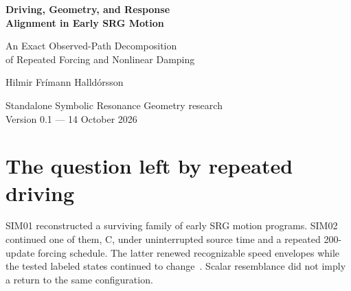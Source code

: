 \documentclass[11pt,a4paper]{article}
\begin{document}
\begin{center}
{\LARGE\bfseries Driving, Geometry, and Response\\[3pt] Alignment in Early SRG Motion\par}
\vspace{6pt}
{\large An Exact Observed-Path Decomposition\\of Repeated Forcing and Nonlinear Damping\par}
\vspace{12pt}
{\large Hilmir Frímann Halldórsson\par}
\vspace{5pt}
{Standalone Symbolic Resonance Geometry research\\Version 0.1 --- 14 October 2026}
\end{center}
\begin{abstract}
Repeated forcing can produce similar collective-speed envelopes without restoring the configurations through which the motion passes. We explain this coexistence in the accepted SIM02 records of historical SRG engine C, using the subsequent SIM03 passive decomposition. The analysis reconstructs the true sequential geometry from saved predecessor and successor positions, without evolving a trajectory. Its population is 1,800 distinct updates: one inherited 200-update prefix and two 800-update continuations. We separate squared impulse, signed velocity--impulse alignment and nonlinear damping in both a squared-speed balance and an exact balance for the actual mean speed. Geometric normalization is usually close to one but has localized exceptions. Alignment remains substantial and can oppose the incoming velocity. Damping is nonexpansive on fixed pre-damping velocity vectors, and the saved records separately show reduced scalar-speed population variance at every driving phase. Neither fact proves contraction of the complete state update. Two reviewer deductions sharpen the interpretation: box geometry rules out a normalization threshold of 0.999, and nearly equal incoming and outgoing phase-averaged spreads are constrained by one-step reindexing. The result explains a finite observed balance, not a calibrated physical theory or a universal recurrence.
\end{abstract}
\section{The question left by repeated driving}
\label{sec:intro}
SIM01 reconstructed a surviving family of early SRG motion programs. SIM02 continued one of them, C, under uninterrupted source time and a repeated 200-update forcing schedule. The latter renewed recognizable speed envelopes while the tested labeled states continued to change~\cite{sim01,sim02}. Scalar resemblance did not imply a return to the same configuration.
\end{document}
